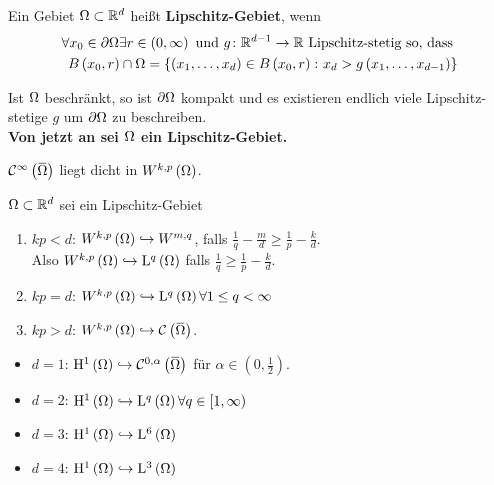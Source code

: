 \begin{definition}
	Ein Gebiet $\Omega\subset\mathbb{R}^{d}$ heißt \textbf{Lipschitz-Gebiet}, wenn
	\begin{align*}
		\forall x_{0}\in\partial\Omega\exists r\in\left(0,\infty\right)\text{ und }g\colon\mathbb{R}^{d-1}\to\mathbb{R}\text{ Lipschitz-stetig so, dass }\\
		B\left(x_{0},r\right)\cap \Omega = \left\{\left(x_{1},\dots,x_{d}\right)\in B\left(x_{0},r\right)\colon x_{d} > g\left(x_{1},\dots,x_{d-1}\right)\right\}
	\end{align*}
\end{definition}

Ist $\Omega$ beschränkt, so ist $\partial\Omega$ kompakt und es existieren endlich viele Lipschitz-stetige $g$ um $\partial\Omega$ zu beschreiben.\\
\textbf{Von jetzt an sei $\Omega$ ein Lipschitz-Gebiet.}

\begin{lemma}[Satz]
	$\C^{\infty}\left(\overbar{\W}\right)$ liegt dicht in $W^{k,p}\left(\Omega\right)$.
\end{lemma}

\begin{lemma}
	$\Omega\subset\mathbb{R}^{d}$ sei ein Lipschitz-Gebiet
	\begin{enumerate}
		\item $kp<d$: $W^{k,p}\left(\Omega\right)\hookrightarrow W^{m,q}$, falls $\frac{1}{q}-\frac{m}{d}\geq\frac{1}{p}-\frac{k}{d}$.\\
			Also $W^{k,p}\left(\Omega\right)\hookrightarrow \mathrm{L}^{q}\left(\Omega\right)$ falls $\frac{1}{q}\geq \frac{1}{p}-\frac{k}{d}$.
		\item $kp=d$: $W^{k,p}\left(\Omega\right)\hookrightarrow\mathrm{L}^{q}\left(\Omega\right)\forall 1\leq q<\infty${}
		\item $kp>d$: $W^{k,p}\left(\W\right)\hookrightarrow\C\left(\overbar{\W}\right)$.
	\end{enumerate}
\end{lemma}

\begin{expl}
	\begin{itemize}
		\item $d=1$: $\H^{1}\left(\W\right) \hookrightarrow \C^{0,\alpha}\left(\overbar{\W}\right)$ für $\alpha\in\left(0,\frac{1}{2}\right)$.{}
		\item $d=2$: $\mathrm{H}^{1}\left(\Omega\right) \hookrightarrow \mathrm{L}^{q}\left(\Omega\right)\forall q\in\left[1,\infty\right)${}
		\item $d=3$: $\mathrm{H}^{1}\left(\Omega\right) \hookrightarrow \mathrm{L}^{6}\left(\Omega\right)${}
		\item $d=4$: $\mathrm{H}^{1}\left(\Omega\right) \hookrightarrow \mathrm{L}^{3}\left(\Omega\right)$
	\end{itemize}
\end{expl}
